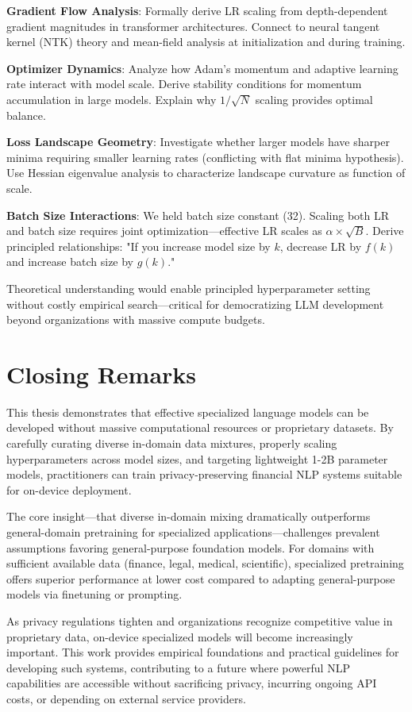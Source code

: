 \textbf{Gradient Flow Analysis}: Formally derive LR scaling from depth-dependent gradient magnitudes in transformer architectures. Connect to neural tangent kernel (NTK) theory and mean-field analysis at initialization and during training.

\textbf{Optimizer Dynamics}: Analyze how Adam's momentum and adaptive learning rate interact with model scale. Derive stability conditions for momentum accumulation in large models. Explain why $1/\sqrt{N}$ scaling provides optimal balance.

\textbf{Loss Landscape Geometry}: Investigate whether larger models have sharper minima requiring smaller learning rates (conflicting with flat minima hypothesis). Use Hessian eigenvalue analysis to characterize landscape curvature as function of scale.

\textbf{Batch Size Interactions}: We held batch size constant (32). Scaling both LR and batch size requires joint optimization—effective LR scales as $\alpha \times \sqrt{B}$. Derive principled relationships: "If you increase model size by $k$, decrease LR by $f(k)$ and increase batch size by $g(k)$."

Theoretical understanding would enable principled hyperparameter setting without costly empirical search—critical for democratizing LLM development beyond organizations with massive compute budgets.

\section{Closing Remarks}

This thesis demonstrates that effective specialized language models can be developed without massive computational resources or proprietary datasets. By carefully curating diverse in-domain data mixtures, properly scaling hyperparameters across model sizes, and targeting lightweight 1-2B parameter models, practitioners can train privacy-preserving financial NLP systems suitable for on-device deployment.

The core insight—that diverse in-domain mixing dramatically outperforms general-domain pretraining for specialized applications—challenges prevalent assumptions favoring general-purpose foundation models. For domains with sufficient available data (finance, legal, medical, scientific), specialized pretraining offers superior performance at lower cost compared to adapting general-purpose models via finetuning or prompting.

As privacy regulations tighten and organizations recognize competitive value in proprietary data, on-device specialized models will become increasingly important. This work provides empirical foundations and practical guidelines for developing such systems, contributing to a future where powerful NLP capabilities are accessible without sacrificing privacy, incurring ongoing API costs, or depending on external service providers.

